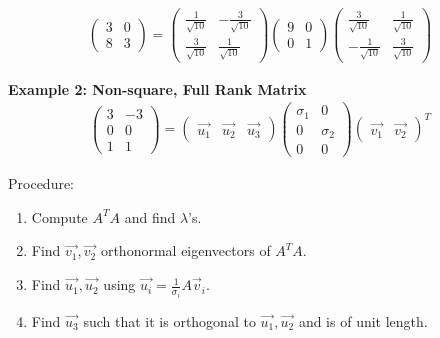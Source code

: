 \begin{align}
    \begin{pmatrix}
        3 & 0 \\ 8 & 3 
    \end{pmatrix} = \begin{pmatrix}
        \frac{1}{\sqrt{10}} & -\frac{3}{\sqrt{10}} \\
        \frac{3}{\sqrt{10}} & \frac{1}{\sqrt{10}}
    \end{pmatrix} \begin{pmatrix}
        9 & 0 \\ 0 & 1
    \end{pmatrix} \begin{pmatrix}
        \frac{3}{\sqrt{10}} & \frac{1}{\sqrt{10}} \\
        -\frac{1}{\sqrt{10}} & \frac{3}{\sqrt{10}}
    \end{pmatrix}
\end{align}

\noindent
\newline
\textbf{Example 2: Non-square, Full Rank Matrix}
\begin{align}
    \begin{pmatrix}
        3 & -3 \\ 0 & 0 \\ 1 & 1 
    \end{pmatrix} = \begin{pmatrix}
        \Vec{u_1} & \Vec{u_2} & \Vec{u_3}
    \end{pmatrix} \begin{pmatrix}
        \sigma_1 & 0 \\ 0 & \sigma_2 \\ 0 & 0
    \end{pmatrix} \begin{pmatrix}
        \Vec{v_1} & \Vec{v_2}
    \end{pmatrix}^T
\end{align}

\noindent
Procedure:
\begin{enumerate}
    \item Compute \(A^T A\) and find \(\lambda\)'s.
    \item Find \(\Vec{v_1}, \Vec{v_2}\) orthonormal eigenvectors of \(A^T A\).
    \item Find \(\Vec{u_1}, \Vec{u_2}\) using \(\Vec{u_i} = \frac{1}{\sigma_i} A\Vec{v}_i\).
    \item Find \(\Vec{u_3}\) such that it is orthogonal to \(\Vec{u_1},\Vec{u_2}\) and is of unit length.
\end{enumerate}

